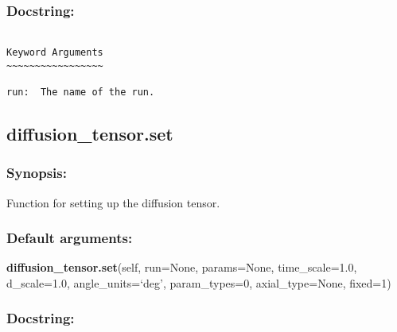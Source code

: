 \subsubsection{Docstring:}

{\scriptsize
\begin{verbatim}

Keyword Arguments
~~~~~~~~~~~~~~~~~

run:  The name of the run.
\end{verbatim}
}



\newpage

\subsection{diffusion\_tensor.set}


\subsubsection{Synopsis:}

Function for setting up the diffusion tensor.

\subsubsection{Default arguments:}

\textsf{\textbf{diffusion\_tensor.set}(self, run=None, params=None, time\_scale=1.0, d\_scale=1.0, angle\_units=`deg', param\_types=0, axial\_type=None, fixed=1)
}


\subsubsection{Docstring:}


